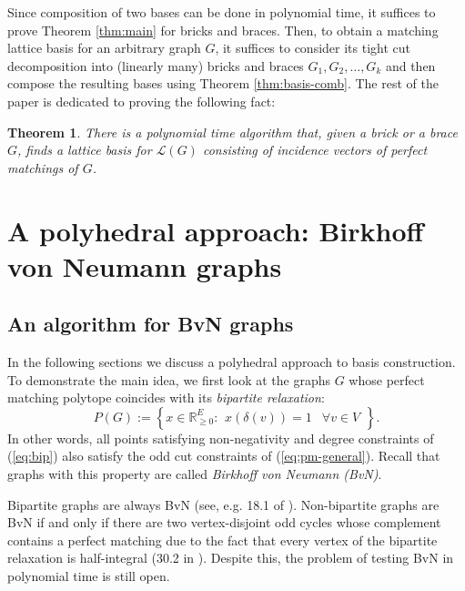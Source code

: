 \documentclass[11pt]{article}
\newcommand{\1}{\mathbf{1}}
\newcommand{\0}{\mathbf{0}}
\newcommand{\zL}{\mathcal L}
\newcommand{\R}{\mathbb{R}}
\newtheorem{theorem}{Theorem}[section]
\begin{document}
Since composition of two bases can be done in polynomial time, it suffices to prove Theorem \ref{thm:main} for bricks and braces. Then, to obtain a matching lattice basis for an arbitrary graph $G$, it suffices to consider its tight cut decomposition into (linearly many) bricks and braces $G_1, G_2, \ldots, G_k$ and then compose the resulting bases using Theorem \ref{thm:basis-comb}. The rest of the paper is dedicated to proving the following fact:
\begin{theorem}\label{thm:main-brick}
    There is a polynomial time algorithm that, given a brick or a brace $G$, finds a lattice basis for $\zL(G)$ consisting of incidence vectors of perfect matchings of $G$.
\end{theorem}

\section{A polyhedral approach: Birkhoff von Neumann graphs}\label{sec:bvn}
\subsection{An algorithm for BvN graphs}
In the following sections we discuss a polyhedral approach to basis construction. To demonstrate the main idea, we first look at the graphs $G$ whose perfect matching polytope coincides with its \emph{bipartite relaxation}: \begin{equation}\label{eq:bip}
     P(G):=\left\{ x\in \R^E_{\geq 0}: \begin{array}{cc}
    x(\delta(v))= 1&  \forall v\in V
\end{array}\right\}.
\end{equation} In other words, all points satisfying non-negativity and degree constraints of (\ref{eq:bip}) also satisfy the odd cut constraints of (\ref{eq:pm-general}).  Recall that graphs with this property are called \emph{Birkhoff von Neumann (BvN)}. 

Bipartite graphs are always BvN (see, e.g. 18.1 of \cite{schrijver2003combinatorial}). Non-bipartite graphs are BvN if and only if there are two vertex-disjoint odd cycles whose complement contains a perfect matching due to the fact that every vertex of the bipartite relaxation is half-integral (30.2 in \cite{schrijver2003combinatorial}). Despite this, the problem of testing BvN in polynomial time is still open.
\end{document}
